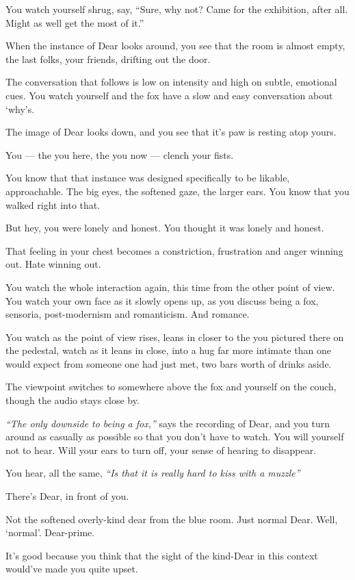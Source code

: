 You watch yourself shrug, say, ``Sure, why not? Came for the exhibition, after all. Might as well get the most of it.''

When the instance of Dear looks around, you see that the room is almost empty, the last folks, your friends, drifting out the door.

The conversation that follows is low on intensity and high on subtle, emotional cues. You watch yourself and the fox have a slow and easy conversation about `why's.

The image of Dear looks down, and you see that it's paw is resting atop yours.

You --- the you here, the you now --- clench your fists.

You know that that instance was designed specifically to be likable, approachable. The big eyes, the softened gaze, the larger ears. You know that you walked right into that.

But hey, you were lonely and honest. You thought it was lonely and honest.

That feeling in your chest becomes a constriction, frustration and anger winning out. Hate winning out.

You watch the whole interaction again, this time from the other point of view. You watch your own face as it slowly opens up, as you discuss being a fox, sensoria, post-modernism and romanticism. And romance.

You watch as the point of view rises, leans in closer to the you pictured there on the pedestal, watch as it leans in close, into a hug far more intimate than one would expect from someone one had just met, two bars worth of drinks aside.

The viewpoint switches to somewhere above the fox and yourself on the couch, though the audio stays close by.

\emph{``The only downside to being a fox,''} says the recording of Dear, and you turn around as casually as possible so that you don't have to watch. You will yourself not to hear. Will your ears to turn off, your sense of hearing to disappear.

You hear, all the same, \emph{``Is that it is really hard to kiss with a muzzle''}

There's Dear, in front of you.

Not the softened overly-kind dear from the blue room. Just normal Dear. Well, `normal'. Dear-prime.

It's good because you think that the sight of the kind-Dear in this context would've made you quite upset.

